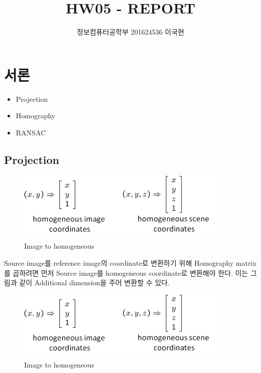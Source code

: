 \documentclass[]{report}
\title{HW05 - REPORT}
\author{정보컴퓨터공학부 201624536 이국현}
\begin{document}
\maketitle


\chapter{서론}
\begin{itemize}
	\item Projection
	\item Homography
	\item RANSAC
\end{itemize} 

\section{Projection}

\begin{figure}[ht!]
	\centering
	\includegraphics[width=0.9\textwidth]{image/image_to_homogeneous.png}
	\caption{Image to homogeneous}
	\label{image_to_homogeneous}
\end{figure}

Source image를 reference image의 coordinate로 변환하기 위해 Homography matrix를 곱하려면 
먼저 Source image를 homogeneous coordinate로 변환해야 한다. 
이는 그림과 같이 Additional dimension을 주어 변환할 수 있다. \\

\begin{figure}[ht!]
    \centering
    \includegraphics[width=0.9\textwidth]{image/image_to_homogeneous.png}
    \caption{Image to homogeneous}
    \label{image_to_homogeneous}
\end{figure}
\end{document}
